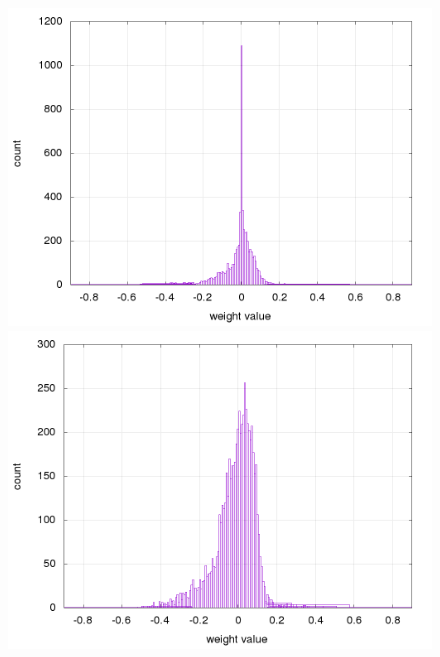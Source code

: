 \documentclass[10pt,a4paper]{article}
\begin{document}
\begin{figure}[!htb]
\centering
\begin{minipage}{.5\textwidth}
  \centering
  \includegraphics[scale=0.32]{../../results/rl_arcade/hnn_trained_0/supervised/layer_1_histogram.png}
\end{minipage}%
\begin{minipage}{.5\textwidth}
  \centering
  \includegraphics[scale=0.32]{../../results/rl_arcade/hnn_trained_5/supervised/layer_1_histogram.png}
\end{minipage}
\end{figure}
\end{document}
